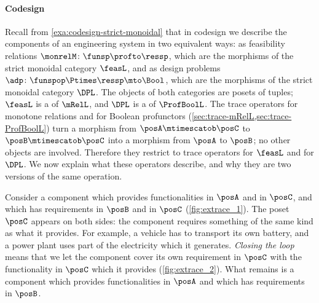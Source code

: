 \paragraph{Codesign}
\label{sec:feedback-codesign}

Recall from \cref{exa:codesign-strict-monoidal} that in codesign we describe the components of an engineering system in two equivalent ways: as feasibility relations $\monrelM \colon \funsp \profto \ressp$, which are the morphisms of the strict monoidal category $\feasL$, and as design problems $\adp \colon \funspop \Ptimes \ressp \mto \Bool$, which are the morphisms of the strict monoidal category $\DPL$.
The objects of both categories are posets of tuples; $\feasL$ is a  of $\mRelL$, and $\DPL$ is a  of $\ProfBoolL$.
The trace operators for monotone relations and for Boolean profunctors (\cref{sec:trace-mRelL,sec:trace-ProfBoolL}) turn a morphism from $\posA \mtimescatob \posC$ to $\posB \mtimescatob \posC$ into a morphism from $\posA$ to $\posB$; no other objects are involved.
Therefore they restrict to trace operators for $\feasL$ and for $\DPL$.
We now explain what these operators describe, and why they are two versions of the same operation.

\begin{marginfigure}
    \centering
    \caption{Design problem with a functionality and a requirement of the same type.
    }
    \label{fig:extrace_1}
\end{marginfigure}

\begin{marginfigure}
    \centering
    \caption{Closing the loop in the design problem.}
    \label{fig:extrace_2}
\end{marginfigure}

Consider a component which provides functionalities in $\posA$ and in $\posC$, and which has requirements in $\posB$ and in $\posC$ (\cref{fig:extrace_1}).
The poset $\posC$ appears on both sides: the component requires something of the same kind as what it provides.
For example, a vehicle has to transport its own battery, and a power plant uses part of the electricity which it generates.
\emph{Closing the loop} means that we let the component cover its own requirement in $\posC$ with the functionality in $\posC$ which it provides (\cref{fig:extrace_2}).
What remains is a component which provides functionalities in $\posA$ and which has requirements in $\posB$.


